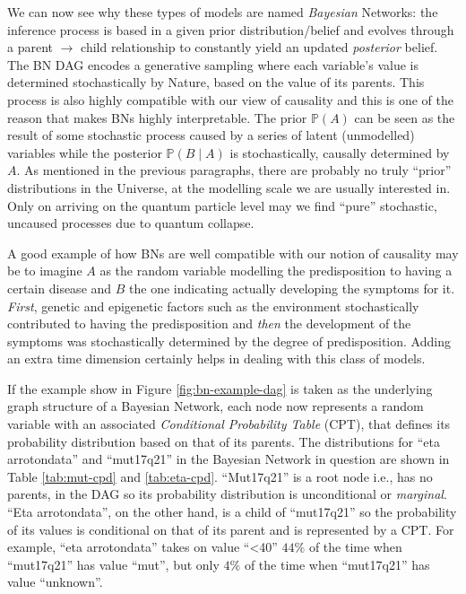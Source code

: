 We can now see why these types of models are named \textit{Bayesian} Networks: the inference process is based in a given prior distribution/belief and evolves through a parent $\rightarrow$ child relationship to constantly yield an updated \textit{posterior} belief.
The BN DAG encodes a generative sampling where each variable's value is determined stochastically by Nature, based on the value of its parents.
This process is also highly compatible with our view of causality and this is one of the reason that makes BNs highly interpretable.
The prior $\mathbb{P}(A)$ can be seen as the result of some stochastic process caused by a series of latent (unmodelled) variables while the posterior $\mathbb{P}(B \mid A)$ is stochastically, causally determined by $A$. 
As mentioned in the previous paragraphs, there are probably no truly ``prior'' distributions in the Universe, at the modelling scale we are usually interested in.
Only on arriving on the quantum particle level may we find ``pure'' stochastic, uncaused processes due to quantum collapse.

A good example of how BNs are well compatible with our notion of causality may be to imagine $A$ as the random variable modelling the predisposition to having a certain disease and $B$ the one indicating actually developing the symptoms for it.
\textit{First}, genetic and epigenetic factors such as the environment stochastically contributed to having the predisposition and \textit{then} the development of the symptoms was stochastically determined by the degree of predisposition.
Adding an extra time dimension certainly helps in dealing with this class of models.

If the example show in Figure \ref{fig:bn-example-dag} is taken as the underlying graph structure of a Bayesian Network, each node now represents a random variable with an associated \textit{Conditional Probability Table} (CPT), that defines its probability distribution based on that of its parents.
The distributions for \enquote{eta arrotondata} and \enquote{mut17q21} in the Bayesian Network in question are shown in Table \ref{tab:mut-cpd} and \ref{tab:eta-cpd}.
\enquote{Mut17q21} is a root node i.e., has no parents, in the DAG so its probability distribution is unconditional or \textit{marginal}.
\enquote{Eta arrotondata}, on the other hand, is a child of \enquote{mut17q21} so the probability of its values is conditional on that of its parent and is represented by a CPT.
For example, \enquote{eta arrotondata} takes on value \enquote{<40} $44\%$ of the time when \enquote{mut17q21} has value \enquote{mut}, but only $4\%$ of the time when \enquote{mut17q21} has value \enquote{unknown}.

